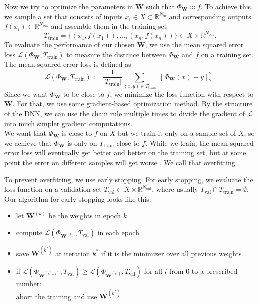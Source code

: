 Now we try to optimize the parameters in $\mathbf{W}$ such that $\Phi_\mathbf{W}\approx f$. To achieve this, we sample a set that consists of inputs $x_i\in X\subset\mathbb{R}^{N_{\mathrm{in}}}$ and corresponding outputs $f(x_i)\in\mathbb{R}^{N_{\mathrm{out}}}$ and assemble them in the training set
\begin{displaymath}
T_\mathrm{train}=\{(x_1,f(x_1)),...,(x_n,f(x_n))\}\subset X\times\mathbb{R}^{N_\mathrm{out}}.
\end{displaymath}
To evaluate the performance of our chosen $\mathbf{W}$, we use the mean squared error loss $\mathscr{L}(\Phi_\mathbf{W},T_\mathrm{train})$ to measure the distance between $\Phi_\mathbf{W}$ and $f$ on a training set. The mean squared error loss is defined as
\begin{displaymath}
\mathscr{L}(\Phi_\mathbf{W},T_\mathrm{train}):=\frac{1}{|T_\mathrm{train}|}\sum_{(x,y)\in T_\mathrm{train}}\| \Phi_\mathbf{W}(x)-y\|_2^2.
\end{displaymath}
Since we want $\Phi_\mathbf{W}$ to be close to $f$, we minimize the loss function with respect to $\mathbf{W}$. For that, we use some gradient-based optimization method. By the structure of the DNN, we can use the chain rule multiple times to divide the gradient of $\mathscr{L}$ into much simpler gradient computations.\\

We want that $\Phi_\mathbf{W}$ is close to $f$ on $X$ but we train it only on a sample set of $X$, so we achieve that $\Phi_\mathbf{W}$ is only on $T_\mathrm{train}$ close to $f$. While we train, the mean squared error loss will eventually get better and better on the training set, but at some point the error on different samples will get worse \cite{Prechelt2012}. We call that overfitting.

To prevent overfitting, we use early stopping. For early stopping, we evaluate the loss function on a validation set $T_\mathrm{val}\subset X\times\mathbb{R}^{N_\mathrm{out}}$, where usually $T_\mathrm{val}\cap T_\mathrm{train}=\emptyset$. Our algorithm for early stopping looks like this:

\begin{itemize}
\item let $\mathbf{W}^{(k)}$ be the weights in epoch $k$%
\item compute $\mathscr{L}(\Phi_{\mathbf{W}^{(k)}},T_\mathrm{val})$ in each epoch
\item save $\mathbf{W}^{(k^*)}$ at iteration $k^*$ if it is the minimizer over all previous weights
\item if $\mathscr{L}(\Phi_{\mathbf{W}^{(k^*+i)}},T_\mathrm{val})\geq\mathscr{L}(\Phi_{\mathbf{W}^{(k^*)}},T_\mathrm{val})$ for all $i$ from $0$ to a prescribed number:\\
abort the training and use $\mathbf{W}^{(k^*)}$
\end{itemize}

